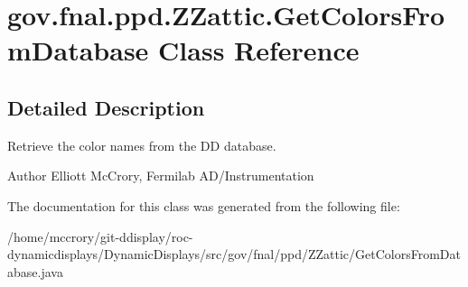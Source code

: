 \hypertarget{classgov_1_1fnal_1_1ppd_1_1ZZattic_1_1GetColorsFromDatabase}{\section{gov.\-fnal.\-ppd.\-Z\-Zattic.\-Get\-Colors\-From\-Database Class Reference}
\label{classgov_1_1fnal_1_1ppd_1_1ZZattic_1_1GetColorsFromDatabase}
}


\subsection{Detailed Description}
Retrieve the color names from the D\-D database.

\begin{DoxyAuthor}{Author}
Elliott Mc\-Crory, Fermilab A\-D/\-Instrumentation 
\end{DoxyAuthor}


The documentation for this class was generated from the following file\-:\begin{DoxyCompactItemize}
\item 
/home/mccrory/git-\/ddisplay/roc-\/dynamicdisplays/\-Dynamic\-Displays/src/gov/fnal/ppd/\-Z\-Zattic/Get\-Colors\-From\-Database.\-java\end{DoxyCompactItemize}
